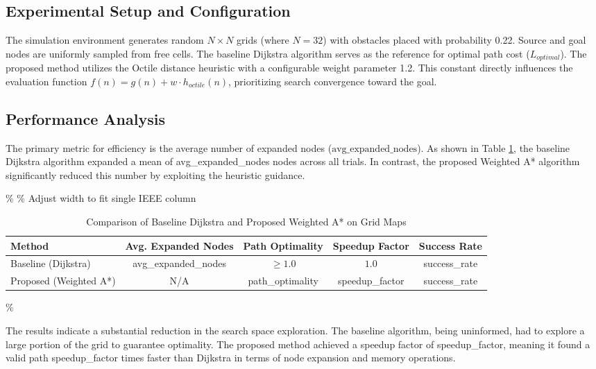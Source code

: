 \documentclass[conference]{IEEEtran}
\renewcommand{\texttt}[1]{{\normalfont\ttfamily #1}}
\begin{document}
\subsection{Experimental Setup and Configuration}
The simulation environment generates random $N \times N$ grids (where $N = \text{32}$) with obstacles placed with probability 0.22. Source and goal nodes are uniformly sampled from free cells. The baseline Dijkstra algorithm serves as the reference for optimal path cost ($L_{optimal}$). The proposed method utilizes the Octile distance heuristic with a configurable weight parameter 1.2. This constant directly influences the evaluation function $f(n) = g(n) + w \cdot h_{octile}(n)$, prioritizing search convergence toward the goal.

\subsection{Performance Analysis}
The primary metric for efficiency is the average number of expanded nodes ($\text{avg\_expanded\_nodes}$). As shown in Table \ref{tab:results}, the baseline Dijkstra algorithm expanded a mean of \texttt{avg\_expanded\_nodes} nodes across all trials. In contrast, the proposed Weighted A* algorithm significantly reduced this number by exploiting the heuristic guidance.

\begin{table}[htbp]
    \centering
    \caption{Comparison of Baseline Dijkstra and Proposed Weighted A* on Grid Maps}
    \label{tab:results}
    \%  \% Adjust width to fit single IEEE column
        \begin{tabular}{l|c|c|c|c}
            \hline
            \textbf{Method} & \textbf{Avg. Expanded Nodes} & \textbf{Path Optimality} & \textbf{Speedup Factor} & \textbf{Success Rate} \\ \hline
            Baseline (Dijkstra) & \texttt{avg\_expanded\_nodes} & $\ge 1.0$ & $1.0$ & \texttt{success\_rate} \\ \hline
            Proposed (Weighted A*) & N/A & \texttt{path\_optimality} & \texttt{speedup\_factor} & \texttt{success\_rate} \\ \hline
        \end{tabular}\%
\end{table}

The results indicate a substantial reduction in the search space exploration. The baseline algorithm, being uninformed, had to explore a large portion of the grid to guarantee optimality. The proposed method achieved a speedup factor of \texttt{speedup\_factor}, meaning it found a valid path \texttt{speedup\_factor} times faster than Dijkstra in terms of node expansion and memory operations.
\end{document}
